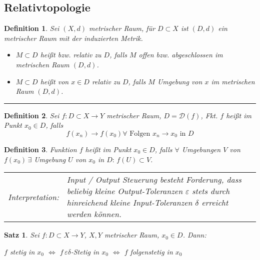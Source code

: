 \documentclass[ngerman,a4paper]{report}
\theoremstyle{break}
\newtheorem{satz}[theorem]{Satz}
\newtheorem*{definition}{Definition}
\newcommand{\highlight}[1]{\emph{#1}}
\renewcommand{\epsilon}{\varepsilon}
\begin{document}
\subsection*{Relativtopologie}
\begin{definition}
	Sei $(X,d)$ metrischer Raum, für $D\subset X$ ist $(D,d)$ ein metrischer Raum mit der induzierten Metrik.
	\begin{itemize}
		\item $M\subset D$ heißt  bzw.  \highlight{relativ zu $D$}, falls $M$ offen bzw. abgeschlossen im metrischen Raum $(D,d)$.
		\item $M\subset D$ heißt  von $x\in D$ relativ zu $D$, falls $M$ Umgebung von $x$ im metrischen Raum $(D,d)$.
	\end{itemize}
\end{definition}
\rule{4cm}{0.4pt}
\begin{definition}
	Sei $f:D\subset X\to Y$ metrischer Raum, $D=\mathcal{D}(f)$, Fkt. $f$ heißt  im Punkt $x_0\in D$, falls \[ f(x_n)\to f(x_0) \forall \text{ Folgen $x_n\to x_0$ in $D$} \]
\end{definition}
\begin{definition}
	Funktion $f$ heißt  im Punkt $x_0\in D$, falls $\forall $ Umgebungen $V$ von $f(x_0)\,\exists $ Umgebung $U$ von $x_0$ in $D:\,f(U)\subset V$.
	
	\begin{tabularx}{\textwidth}{lX}
		\noindent\highlight{Interpretation:} & Input / Output Steuerung besteht Forderung, dass beliebig kleine Output-Toleranzen $\epsilon$ stets durch hinreichend kleine Input-Toleranzen $\delta$ erreicht werden können.
	\end{tabularx}
\end{definition}

\begin{satz}
	Sei $f:D\subset X\to Y$, $X,Y$ metrischer Raum, $x_0\in D$. Dann:
	\begin{center}
		$f$ stetig in $x_0$ $\Leftrightarrow$ $f \,\epsilon\delta$-Stetig in $x_0$ $\Leftrightarrow$ $f$ folgenstetig in $x_0$
	\end{center}
\end{satz}
\end{document}
